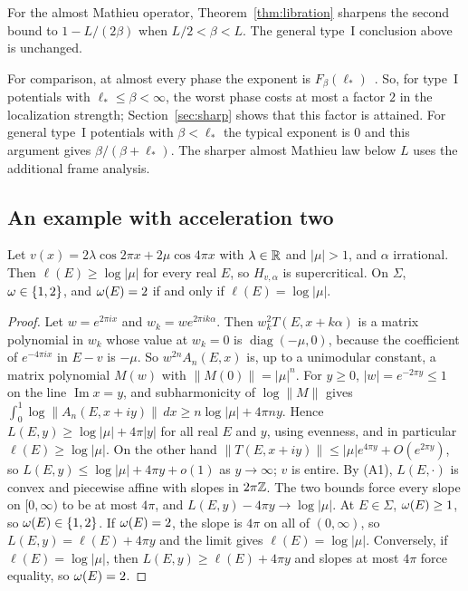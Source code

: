 For the almost Mathieu operator, Theorem~\ref{thm:libration} sharpens the second bound to $1-L/(2\beta)$ when $L/2<\beta<L$. The general type~I conclusion above is unchanged.

For comparison, at almost every phase the exponent is $F_\beta(\ell_*)$~\cite[Theorem~A]{DMuniv}. So, for type~I potentials with $\ell_*\le\beta<\infty$, the worst phase costs at most a factor $2$ in the localization strength; Section~\ref{sec:sharp} shows that this factor is attained. For general type~I potentials with $\beta<\ell_*$ the typical exponent is $0$ and this argument gives $\beta/(\beta+\ell_*)$. The sharper almost Mathieu law below $L$ uses the additional frame analysis.

\subsection{An example with acceleration two}

\begin{proposition}\label{prop:twoharm}
Let $v(x)=2\lambda\cos2\pi x+2\mu\cos4\pi x$ with $\lambda\in\mathbb R$ and $|\mu|>1$, and $\alpha$ irrational. Then $\ell(E)\ge\log|\mu|$ for every real $E$, so $H_{v,\alpha}$ is supercritical. On $\Sigma$, $\omega\in\{1,2\}$, and $\omega(E)=2$ if and only if $\ell(E)=\log|\mu|$.
\end{proposition}

\begin{proof}
Let $w=e^{2\pi ix}$ and $w_k=we^{2\pi ik\alpha}$. Then $w_k^2T(E,x+k\alpha)$ is a matrix polynomial in $w_k$ whose value at $w_k=0$ is $\operatorname{diag}(-\mu,0)$, because the coefficient of $e^{-4\pi ix}$ in $E-v$ is $-\mu$. So $w^{2n}A_n(E,x)$ is, up to a unimodular constant, a matrix polynomial $M(w)$ with $\|M(0)\|=|\mu|^n$. For $y\ge0$, $|w|=e^{-2\pi y}\le1$ on the line $\operatorname{Im}x=y$, and subharmonicity of $\log\|M\|$ gives $\int_0^1\log\|A_n(E,x+iy)\|\,dx\ge n\log|\mu|+4\pi ny$. Hence $L(E,y)\ge\log|\mu|+4\pi|y|$ for all real $E$ and $y$, using evenness, and in particular $\ell(E)\ge\log|\mu|$. On the other hand $\|T(E,x+iy)\|\le|\mu|e^{4\pi y}+O(e^{2\pi y})$, so $L(E,y)\le\log|\mu|+4\pi y+o(1)$ as $y\to\infty$; $v$ is entire. By (A1), $L(E,\cdot)$ is convex and piecewise affine with slopes in $2\pi\mathbb Z$. The two bounds force every slope on $[0,\infty)$ to be at most $4\pi$, and $L(E,y)-4\pi y\to\log|\mu|$. At $E\in\Sigma$, $\omega(E)\ge1$, so $\omega(E)\in\{1,2\}$. If $\omega(E)=2$, the slope is $4\pi$ on all of $(0,\infty)$, so $L(E,y)=\ell(E)+4\pi y$ and the limit gives $\ell(E)=\log|\mu|$. Conversely, if $\ell(E)=\log|\mu|$, then $L(E,y)\ge\ell(E)+4\pi y$ and slopes at most $4\pi$ force equality, so $\omega(E)=2$.
\end{proof}

